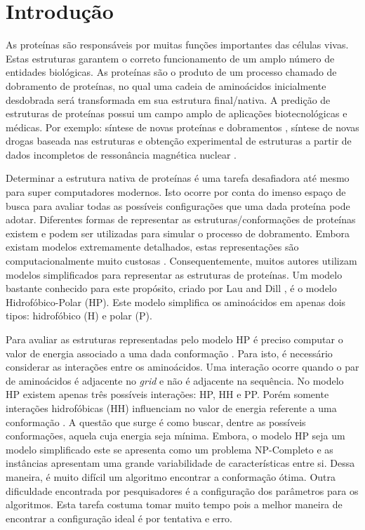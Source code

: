 \chapter{Introdução}

As proteínas são responsáveis por muitas funções importantes das células vivas. Estas estruturas garantem o correto funcionamento de um amplo número de entidades biológicas. As proteínas são o produto de um processo chamado de dobramento de proteínas, no qual uma cadeia de aminoácidos inicialmente desdobrada será transformada em sua estrutura final/nativa. A predição de estruturas de proteínas possui um campo amplo de aplicações biotecnológicas e médicas. Por exemplo: síntese de novas proteínas e dobramentos \cite{wang2012structural, rothlisberger2008kemp}, síntese de novas drogas baseada nas estruturas \cite{qian2004improvement, krieger2009improving}  e obtenção experimental de estruturas a partir de dados incompletos de ressonância magnética nuclear \cite{shen2009novo}.  

Determinar a estrutura nativa de proteínas é uma tarefa desafiadora até mesmo para super computadores modernos. Isto ocorre por conta do imenso espaço de busca para avaliar todas as possíveis configurações que uma dada proteína pode adotar. Diferentes formas de representar as estruturas/conformações de proteínas existem e podem ser utilizadas para simular o processo de dobramento. Embora existam modelos extremamente detalhados, estas representações são computacionalmente muito custosas \cite{benitez2015algoritmo, santana2008protein}. Consequentemente, muitos autores \cite{custodio2004investigation,hsu2003growth,lin2011protein,unger1993genetic,santana2008protein,custodio2014multiple, garza2012locality} utilizam modelos simplificados para representar as estruturas de proteínas. Um modelo bastante conhecido para este propósito, criado por Lau and Dill \cite{lau1989lattice}, é o modelo Hidrofóbico-Polar (HP). Este modelo simplifica os aminoácidos em apenas dois tipos: hidrofóbico (H) e polar (P). 

Para avaliar as estruturas representadas pelo modelo HP é preciso computar o valor de energia associado a uma dada conformação \cite{unger1993genetic}. Para isto, é necessário considerar as interações entre os aminoácidos. Uma interação ocorre quando o par de aminoácidos é adjacente no \textit{grid} e não é adjacente na sequência. No modelo HP existem apenas três possíveis interações: HP, HH e PP. Porém somente interações hidrofóbicas (HH) influenciam no valor de energia referente a uma conformação \cite{unger1993genetic}. A questão que surge é como buscar, dentre as possíveis conformações, aquela cuja energia seja mínima. Embora, o modelo HP seja um modelo simplificado este se apresenta como um problema NP-Completo e as instâncias apresentam uma grande variabilidade de características entre si. Dessa maneira, é muito difícil um algoritmo encontrar a conformação ótima. Outra dificuldade encontrada por pesquisadores é a configuração dos parâmetros para os algoritmos. Esta tarefa costuma tomar muito tempo pois a melhor maneira de encontrar a configuração ideal é por tentativa e erro.

